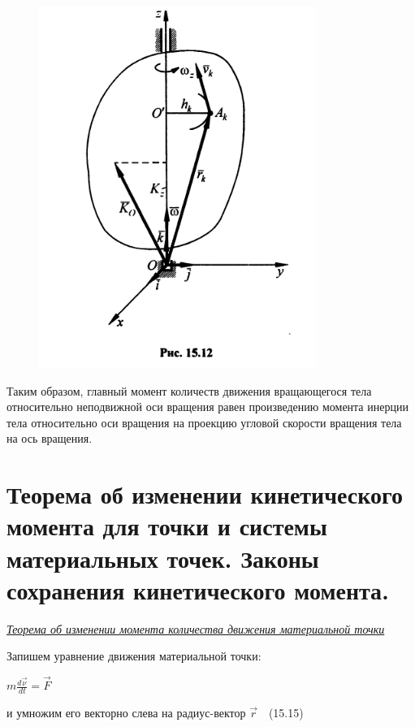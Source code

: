 {\begin{center}
    \par \begin{figure}[H]
    \centering \includegraphics[scale = 0.55]{img/15.12.jpeg}
    \end{figure}

    \par Таким образом, главный момент количеств движения вращающегося тела относительно неподвижной оси вращения равен произведению момента инерции тела относительно оси вращения на проекцию угловой скорости вращения тела на ось вращения.
\end{center}
\section{Теорема об изменении кинетического момента для точки и системы материальных точек. Законы сохранения кинетического момента.}
\begin{center}
    \par \textit {\underline{Теорема об изменении момента количества движения   материальной точки}}
    
    \par Запишем уравнение движения материальной точки:
    
    \par $m\frac{d\vec{\nu}}{dt}=\vec{F}$
    
    \par и умножим его векторно слева на радиус-вектор $\vec{r}\quad $(15.15)
    

\end{center}}
